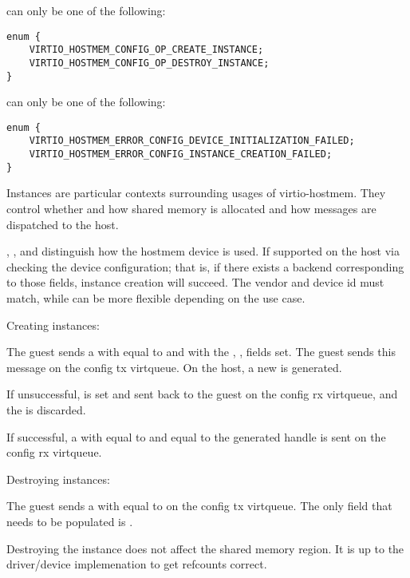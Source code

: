  can only be one of the following:

\begin{lstlisting}
enum {
    VIRTIO_HOSTMEM_CONFIG_OP_CREATE_INSTANCE;
    VIRTIO_HOSTMEM_CONFIG_OP_DESTROY_INSTANCE;
}
\end{lstlisting}

 can only be one of the following:

\begin{lstlisting}
enum {
    VIRTIO_HOSTMEM_ERROR_CONFIG_DEVICE_INITIALIZATION_FAILED;
    VIRTIO_HOSTMEM_ERROR_CONFIG_INSTANCE_CREATION_FAILED;
}
\end{lstlisting}

Instances are particular contexts surrounding usages of virtio-hostmem.
They control whether and how shared memory is allocated
and how messages are dispatched to the host.

, , and 
distinguish how the hostmem device is used.
If supported on the host via checking the device configuration;
that is, if there exists a backend corresponding to those fields,
instance creation will succeed.
The vendor and device id must match,
while  can be more flexible depending on the use case.

Creating instances:

The guest sends a 
with  equal to 
and with the , ,  fields set.
The guest sends this message on the config tx virtqueue.
On the host, a new  is generated.

If unsuccessful,  is set and sent back to the guest
on the config rx virtqueue, and the  is discarded.

If successful, a 
with  equal to 
and  equal to the generated handle
is sent on the config rx virtqueue.

Destroying instances:

The guest sends a 
with  equal to 
on the config tx virtqueue.
The only field that needs to be populated
is .

Destroying the instance does not affect the shared memory region.
It is up to the driver/device implemenation to get refcounts correct.

